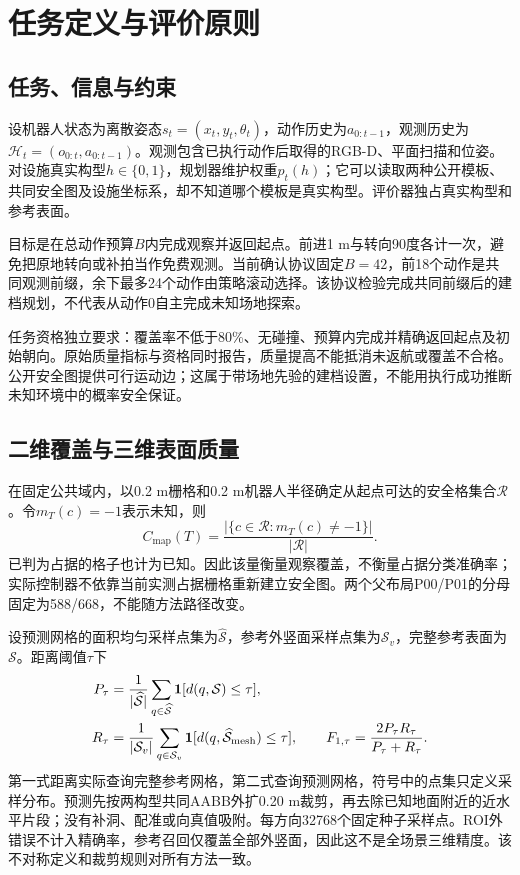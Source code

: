 \documentclass[11pt,a4paper]{article}
\newcommand{\C}{C_{\mathrm{map}}}
\begin{document}
\section{任务定义与评价原则}
\subsection{任务、信息与约束}
设机器人状态为离散姿态$s_t=(x_t,y_t,\theta_t)$，动作历史为$a_{0:t-1}$，观测历史为$\mathcal H_t=(o_{0:t},a_{0:t-1})$。观测包含已执行动作后取得的RGB-D、平面扫描和位姿。对设施真实构型$h\in\{0,1\}$，规划器维护权重$p_t(h)$；它可以读取两种公开模板、共同安全图及设施坐标系，却不知道哪个模板是真实构型。评价器独占真实构型和参考表面。

目标是在总动作预算$B$内完成观察并返回起点。前进1 m与转向90度各计一次，避免把原地转向或补拍当作免费观测。当前确认协议固定$B=42$，前18个动作是共同观测前缀，余下最多24个动作由策略滚动选择。该协议检验完成共同前缀后的建档规划，不代表从动作0自主完成未知场地探索。

任务资格独立要求：覆盖率不低于80\%、无碰撞、预算内完成并精确返回起点及初始朝向。原始质量指标与资格同时报告，质量提高不能抵消未返航或覆盖不合格。公开安全图提供可行运动边；这属于带场地先验的建档设置，不能用执行成功推断未知环境中的概率安全保证。

\subsection{二维覆盖与三维表面质量}
在固定公共域内，以0.2 m栅格和0.2 m机器人半径确定从起点可达的安全格集合$\mathcal R$。令$m_T(c)=-1$表示未知，则
\begin{equation}
\C(T)=\frac{\left|\{c\in\mathcal R:m_T(c)\ne-1\}\right|}{|\mathcal R|}.
\label{eq:coverage}
\end{equation}
已判为占据的格子也计为已知。因此该量衡量观察覆盖，不衡量占据分类准确率；实际控制器不依靠当前实测占据栅格重新建立安全图。两个父布局P00/P01的分母固定为588/668，不能随方法路径改变。

设预测网格的面积均匀采样点集为$\widehat{\mathcal S}$，参考外竖面采样点集为$\mathcal S_v$，完整参考表面为$\mathcal S$。距离阈值$\tau$下
\begin{align}
P_\tau&=\frac{1}{|\widehat{\mathcal S}|}\sum_{q\in\widehat{\mathcal S}}
\mathbf1[d(q,\mathcal S)\le\tau],\\
R_\tau&=\frac{1}{|\mathcal S_v|}\sum_{q\in\mathcal S_v}
\mathbf1[d(q,\widehat{\mathcal S}_{\rm mesh})\le\tau],\qquad
F_{1,\tau}=\frac{2P_\tau R_\tau}{P_\tau+R_\tau}.
\label{eq:f1}
\end{align}
第一式距离实际查询完整参考网格，第二式查询预测网格，符号中的点集只定义采样分布。预测先按两构型共同AABB外扩0.20 m裁剪，再去除已知地面附近的近水平片段；没有补洞、配准或向真值吸附。每方向32768个固定种子采样点。ROI外错误不计入精确率，参考召回仅覆盖全部外竖面，因此这不是全场景三维精度。该不对称定义和裁剪规则对所有方法一致。
\end{document}
